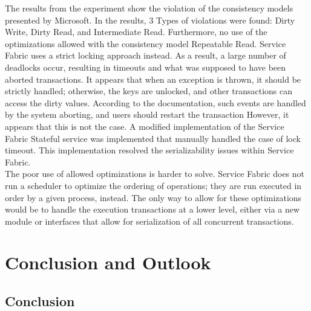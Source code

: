 \documentclass[a4paper,10pt,titlepage]{report}
\begin{document}
The results from the experiment show the violation of the consistency models presented by Microsoft. In the results, 3 Types of violations were found: Dirty Write, Dirty Read, and Intermediate Read. Furthermore, no use of the optimizations allowed with the consistency model Repeatable Read. Service Fabric uses a strict locking approach instead. As a result, a large number of deadlocks occur, resulting in timeouts and what was supposed to have been aborted transactions. It appears that when an exception is thrown, it should be strictly handled; otherwise, the keys are unlocked, and other transactions can access the dirty values. According to the documentation, such events are handled by the system aborting, and users should restart the transaction \cite{servicefabricguidelines}
However, it appears that this is not the case. A modified implementation of the Service Fabric Stateful service was implemented that manually handled the case of lock timeout. This implementation resolved the serializability issues within Service Fabric.\\
\vspace{5mm}
The poor use of allowed optimizations is harder to solve. Service Fabric does not run a scheduler to optimize the ordering of operations; they are run executed in order by a given process, instead. The only way to allow for these optimizations would be to handle the execution transactions at a lower level, either via a new module or interfaces that allow for serialization of all concurrent transactions.

\chapter{Conclusion and Outlook}
\section*{Conclusion}
\end{document}
